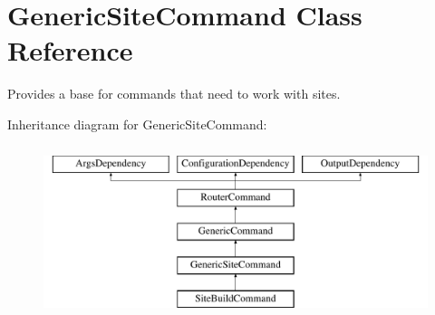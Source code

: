 \hypertarget{classGenericSiteCommand}{\section{Generic\-Site\-Command Class Reference}
\label{classGenericSiteCommand}
}


Provides a base for commands that need to work with sites.  


Inheritance diagram for Generic\-Site\-Command\-:\begin{figure}[H]
\begin{center}
\leavevmode
\includegraphics[height=5.000000cm]{classGenericSiteCommand}
\end{center}
\end{figure}
